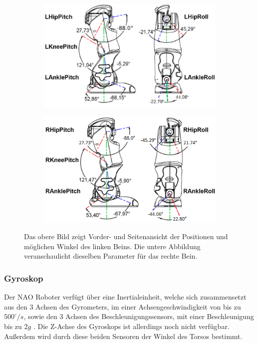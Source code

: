 


\begin{figure}[tb]
	\hfill
	\begin{subfigure}[c]{\linewidth}
		\centering
		\includegraphics[width=0.7\linewidth]{Bilder/hardware_llegjoint.png}
	\end{subfigure}
	\begin{subfigure}[c]{\linewidth}
		\centering
		\includegraphics[width=0.7\linewidth]{Bilder/hardware_rlegjoint.png}
	\end{subfigure}
	\hfill
	\caption{Das obere Bild zeigt Vorder- und Seitenansicht der Positionen und möglichen Winkel des linken Beins. Die untere Abbildung veranschaulicht dieselben Parameter für das rechte Bein. \cite[in /kinematics-data/joints]{nao_docu_dev_guide}}
	\label{hardware_legjoint}
\end{figure}

\subsubsection*{Gyroskop}
Der NAO Roboter verfügt über eine Inertialeinheit, welche sich zusammensetzt aus den 3 Achsen des Gyrometers, im einer Achsengeschwindigkeit von bis zu $500^\circ\unit{/s}$, sowie den 3 Achsen des Beschleunigungssensors, mit einer Beschleunigung bis zu $2\unit{g}$ \cite[/Technical overview/Inertial unit]{nao_docu_dev_guide}. Die Z-Achse des Gyroskops ist allerdings noch nicht verfügbar. Außerdem wird durch diese beiden Sensoren der Winkel des Torsos bestimmt. 
\FloatBarrier

